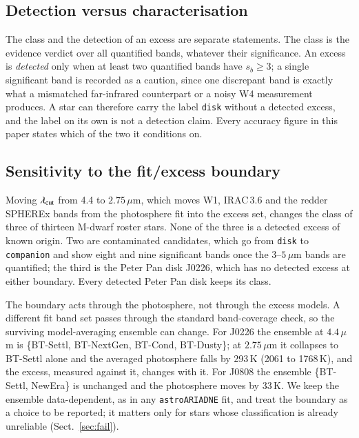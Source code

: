 \documentclass{aa}
\newcommand{\ariadne}{\texttt{astroARIADNE}}
\begin{document}
\subsection{Detection versus characterisation}
\label{sec:detect}

The class and the detection of an excess are separate statements. The class is
the evidence verdict over all quantified bands, whatever their significance. An
excess is \emph{detected} only when at least two quantified bands have
$s_b \ge 3$; a single significant band is recorded as a caution, since one
discrepant band is exactly what a mismatched far-infrared counterpart or a noisy
W4 measurement produces. A star can therefore carry the label \texttt{disk}
without a detected excess, and the label on its own is not a detection claim.
Every accuracy figure in this paper states which of the two it conditions on.

\subsection{Sensitivity to the fit/excess boundary}
\label{sec:routing}

Moving $\lambda_{\rm cut}$ from 4.4 to $2.75\,\mu$m, which moves W1, IRAC\,3.6 and
the redder SPHEREx bands from the photosphere fit into the excess set, changes
the class of three of thirteen M-dwarf roster stars. None of the three is a
detected excess of known origin. Two are contaminated candidates, which go from
\texttt{disk} to \texttt{companion} and show eight and nine significant bands
once the 3--$5\,\mu$m bands are quantified; the third is the Peter Pan disk J0226,
which has no detected excess at either boundary. Every detected Peter Pan disk
keeps its class.

The boundary acts through the photosphere, not through the excess models. A
different fit band set passes through the standard band-coverage check, so the
surviving model-averaging ensemble can change. For J0226 the ensemble at
$4.4\,\mu$m is \{BT-Settl, BT-NextGen, BT-Cond, BT-Dusty\}; at $2.75\,\mu$m it
collapses to BT-Settl alone and the averaged photosphere falls by 293\,K
(2061 to 1768\,K), and the excess, measured against it, changes with it. For
J0808 the ensemble \{BT-Settl, NewEra\} is unchanged and the photosphere moves by
33\,K. We keep the ensemble data-dependent, as in any \ariadne{} fit, and treat
the boundary as a choice to be reported; it matters only for stars whose
classification is already unreliable (Sect.~\ref{sec:fail}).
\end{document}
